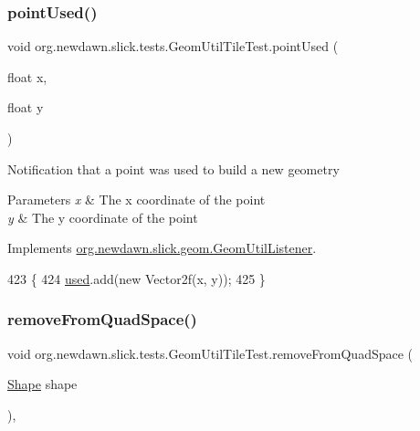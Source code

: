 \subsubsection{\texorpdfstring{point\+Used()}{pointUsed()}}
{\footnotesize\ttfamily void org.\+newdawn.\+slick.\+tests.\+Geom\+Util\+Tile\+Test.\+point\+Used (\begin{DoxyParamCaption}\item[{float}]{x,  }\item[{float}]{y }\end{DoxyParamCaption})\hspace{0.3cm}{\ttfamily [inline]}}

Notification that a point was used to build a new geometry


\begin{DoxyParams}{Parameters}
{\em x} & The x coordinate of the point \\
\hline
{\em y} & The y coordinate of the point \\
\hline
\end{DoxyParams}


Implements \mbox{\hyperlink{interfaceorg_1_1newdawn_1_1slick_1_1geom_1_1_geom_util_listener_a73777bd9904d9472db523c10d644db0a}{org.\+newdawn.\+slick.\+geom.\+Geom\+Util\+Listener}}.


\begin{DoxyCode}
423                                             \{
424         \mbox{\hyperlink{classorg_1_1newdawn_1_1slick_1_1tests_1_1_geom_util_tile_test_a6be492c2a117f930c9f326d72da0cc96}{used}}.add(\textcolor{keyword}{new} Vector2f(x, y));
425     \}
\end{DoxyCode}
\mbox{\label{classorg_1_1newdawn_1_1slick_1_1tests_1_1_geom_util_tile_test_a0c5b1d585e90c83539103524fa97a4dd}} 
\subsubsection{\texorpdfstring{remove\+From\+Quad\+Space()}{removeFromQuadSpace()}}
{\footnotesize\ttfamily void org.\+newdawn.\+slick.\+tests.\+Geom\+Util\+Tile\+Test.\+remove\+From\+Quad\+Space (\begin{DoxyParamCaption}\item[{\mbox{\hyperlink{classorg_1_1newdawn_1_1slick_1_1geom_1_1_shape}{Shape}}}]{shape }\end{DoxyParamCaption})\hspace{0.3cm}{\ttfamily [inline]}, {\ttfamily [private]}}


